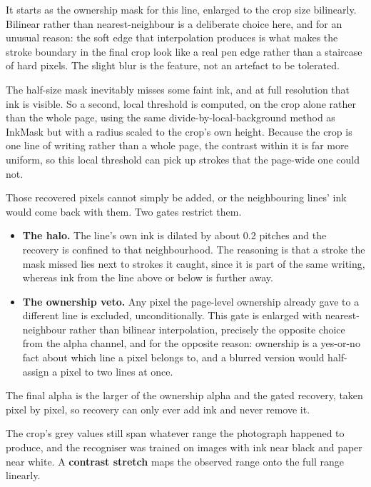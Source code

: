 It starts as the ownership mask for this line, enlarged to the crop size bilinearly. Bilinear rather than nearest-neighbour is a deliberate choice here, and for an unusual reason: the soft edge that interpolation produces is what makes the stroke boundary in the final crop look like a real pen edge rather than a staircase of hard pixels. The slight blur is the feature, not an artefact to be tolerated.


The half-size mask inevitably misses some faint ink, and at full resolution that ink is visible. So a second, local threshold is computed, on the crop alone rather than the whole page, using the same divide-by-local-background method as InkMask but with a radius scaled to the crop's own height. Because the crop is one line of writing rather than a whole page, the contrast within it is far more uniform, so this local threshold can pick up strokes that the page-wide one could not.

Those recovered pixels cannot simply be added, or the neighbouring lines' ink would come back with them. Two gates restrict them.


\begin{itemize}\setlength\itemsep{0pt}
  \item \textbf{The halo.} The line's own ink is dilated by about 0.2 pitches and the recovery is confined to that neighbourhood. The reasoning is that a stroke the mask missed lies next to strokes it caught, since it is part of the same writing, whereas ink from the line above or below is further away.
  \item \textbf{The ownership veto.} Any pixel the page-level ownership already gave to a different line is excluded, unconditionally. This gate is enlarged with nearest-neighbour rather than bilinear interpolation, precisely the opposite choice from the alpha channel, and for the opposite reason: ownership is a yes-or-no fact about which line a pixel belongs to, and a blurred version would half-assign a pixel to two lines at once.
\end{itemize}
The final alpha is the larger of the ownership alpha and the gated recovery, taken pixel by pixel, so recovery can only ever add ink and never remove it.


The crop's grey values still span whatever range the photograph happened to produce, and the recogniser was trained on images with ink near black and paper near white. A \textbf{contrast stretch} maps the observed range onto the full range linearly.


